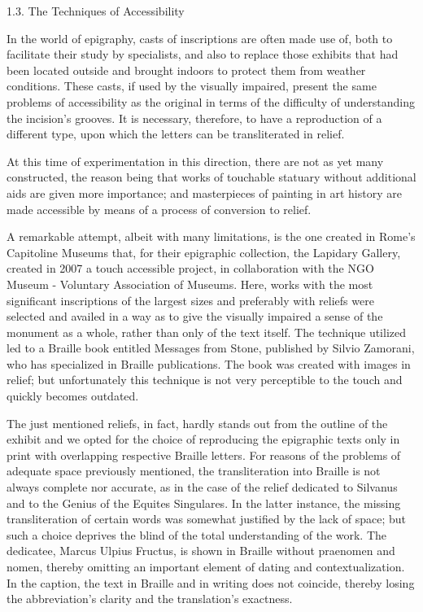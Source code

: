 \documentclass[amsthm,ebook]{saparticle}
\begin{document}
\bigskip


\bigskip

1.3. The Techniques of Accessibility


\bigskip

In the world of epigraphy, casts of inscriptions are often made use of, both to facilitate their study by specialists,
and also to replace those exhibits that had been located outside and brought indoors to protect them from weather
conditions. These casts, if used by the visually impaired, present the same problems of accessibility as the original
in terms of the difficulty of understanding the incision’s grooves. It is necessary, therefore, to have a reproduction
of a different type, upon which the letters can be transliterated in relief.

At this time of experimentation in this direction, there are not as yet many constructed, the reason being that works of
touchable statuary without additional aids are given more importance; and masterpieces of painting in art history are
made accessible by means of a process of conversion to relief.

A remarkable attempt, albeit with many limitations, is the one created in Rome’s Capitoline Museums that, for their
epigraphic collection, the Lapidary Gallery, created in 2007 a touch accessible project, in collaboration with the NGO
Museum - Voluntary Association of Museums. Here, works with the most significant inscriptions of the largest sizes and
preferably with reliefs were selected and availed in a way as to give the visually impaired a sense of the monument as
a whole, rather than only of the text itself. The technique utilized led to a Braille book entitled Messages from
Stone, published by Silvio Zamorani, who has specialized in Braille publications. The book was created with images in
relief; but unfortunately this technique is not very perceptible to the touch and quickly becomes outdated.

The just mentioned reliefs, in fact, hardly stands out from the outline of the exhibit and we opted for the choice of
reproducing the epigraphic texts only in print with overlapping respective Braille letters. For reasons of the problems
of adequate space previously mentioned, the transliteration into Braille is not always complete nor accurate, as in the
case of the relief dedicated to Silvanus and to the Genius of the Equites Singulares. In the latter instance, the
missing transliteration of certain words was somewhat justified by the lack of space; but such a choice deprives the
blind of the total understanding of the work. The dedicatee, Marcus Ulpius Fructus, is shown in Braille without
praenomen and nomen, thereby omitting an important element of dating and contextualization. In the caption, the text in
Braille and in writing does not coincide, thereby losing the abbreviation’s clarity and the translation’s exactness.
\end{document}
